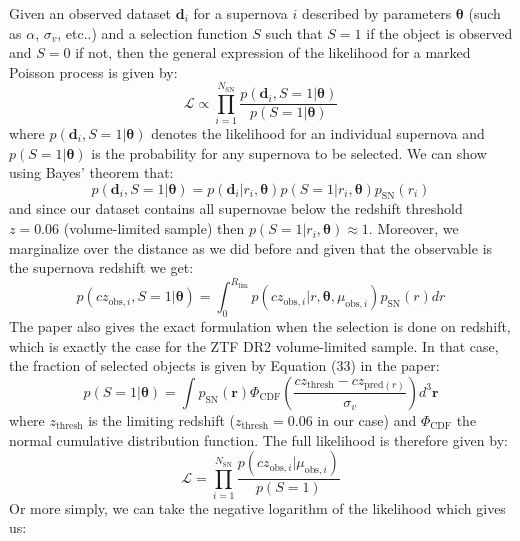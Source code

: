 Given an observed dataset $\mathbf{d}_i$ for a supernova $i$ described by parameters $\boldsymbol{\theta}$ (such as $\alpha$, $\sigma_v$, etc..) 
and a selection function $S$ such that $S=1$ if the object is observed and $S=0$ if not, then the general expression of the likelihood for a marked Poisson process is given by:
\begin{equation}
    \mathcal{L} \propto \prod_{i=1}^{N_{\text{SN}}} \frac{p(\mathbf{d}_i, S=1 | \boldsymbol{\theta})}{p(S=1 | \boldsymbol{\theta})}
\end{equation}
where $p(\mathbf{d}_i, S=1 | \boldsymbol{\theta})$ denotes the likelihood for an individual supernova and $p(S=1 | \boldsymbol{\theta})$ is the probability for any supernova to 
be selected. We can show using Bayes' theorem that:
\begin{equation}
    p(\mathbf{d}_i, S=1 | \boldsymbol{\theta}) = p(\mathbf{d}_i|r_i, \boldsymbol{\theta})p(S=1|r_i, \boldsymbol{\theta})p_{\text{SN}}(r_i)
\end{equation}
and since our dataset contains all supernovae below the redshift threshold $z=0.06$ (volume-limited sample) then $p(S=1|r_i, \boldsymbol{\theta}) \approx 1$. Moreover, we marginalize over the distance as 
we did before and given that the observable is the supernova redshift we get:
\begin{equation}
    p(cz_{\text{obs},i}, S=1 | \boldsymbol{\theta}) = \int_{0}^{R_{\text{lim}}} p(cz_{\text{obs},i}|r, \boldsymbol{\theta}, \mu_{\text{obs},i})p_{\text{SN}}(r) dr
\end{equation}
The paper also gives the exact formulation when 
the selection is done on redshift, which is exactly the case for the ZTF DR2 volume-limited sample. In that case, the fraction of selected objects 
is given by Equation (33) in the paper:
\begin{equation}
    p(S=1| \boldsymbol{\theta}) = \int p_{\text{SN}}(\mathbf{r}) \Phi_{\text{CDF}} \left(\frac{cz_{\text{thresh}} - cz_{\text{pred}(r)}}{\sigma_v}\right) d^3\mathbf{r}
\end{equation}
where $z_{\text{thresh}}$ is the limiting redshift ($z_{\text{thresh}}=0.06$ in our case) and $\Phi_{\text{CDF}}$ the normal cumulative distribution function. The full likelihood 
is therefore given by:
\begin{equation}
    \mathcal{L} = \prod_{i=1}^{N_\text{SN}} \frac{p(cz_{\text{obs},i}|\mu_{\text{obs},i})}{p(S=1)}
\end{equation}
Or more simply, we can take the negative logarithm of the likelihood which gives us:
